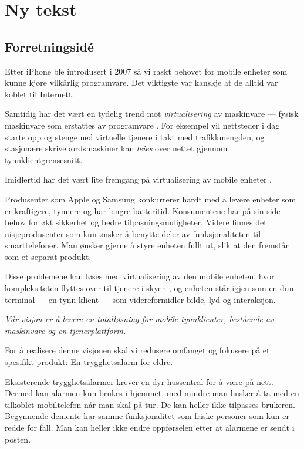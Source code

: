 \chapter{Ny tekst}

\section{Forretningsidé}

Etter iPhone ble introdusert i 2007 så vi raskt behovet for mobile enheter som
kunne kjøre vilkårlig programvare. Det viktigste var kanskje at de alltid var
koblet til Internett.

Samtidig har det vært en tydelig trend mot \textit{virtualisering} av
maskinvare --- fysisk maskinvare som erstattes av programvare
\cite{2006.virtualization.trends}.  For eksempel vil nettsteder i dag starte
opp og stenge ned virtuelle tjenere i takt med trafikkmengden, og stasjonære
skrivebordsmaskiner kan \textit{leies} over nettet gjennom
tynnklientgrensesnitt.

Imidlertid har det vært lite fremgang på virtualisering av mobile enheter
\cite{embedded.virtualization}.

Produsenter som Apple og Samsung konkurrerer hardt med å levere enheter som er
kraftigere, tynnere og har lengre batteritid.
%
Konsumentene har på sin side behov for økt sikkerhet og bedre
tilpasningsmuligheter.
%
Videre finnes det nisjeprodusenter som kun ønsker å benytte deler av
funksjonaliteten til smarttelefoner.
%
Man ønsker gjerne å styre enheten fullt ut, slik at den fremstår som et separat
produkt.

Disse problemene kan løses med virtualisering av den mobile enheten, hvor
kompleksiteten flyttes over til tjenere i skyen \cite{mobil.virt.fordel}, og
enheten står igjen som en dum terminal --- en tynn klient --- som
videreformidler bilde, lyd og interaksjon.

\textit{Vår visjon er å levere en totalløsning for mobile tynnklienter,
bestående av maskinvare og en tjenerplattform.}

For å realisere denne visjonen skal vi redusere omfanget og fokusere på et
spesifikt produkt: En trygghetsalarm for eldre.

Eksisterende trygghetsalarmer krever en dyr hussentral for å være på nett.
Dermed kan alarmen kun brukes i hjemmet, med mindre man husker å ta med en
tilkoblet mobiltelefon når man skal på tur. De kan heller ikke tilpasses
brukeren. Begynnende demente har samme funksjonalitet som friske personer som
kun er redde for fall. Man kan heller ikke endre oppførselen etter at alarmene
er sendt i posten.

